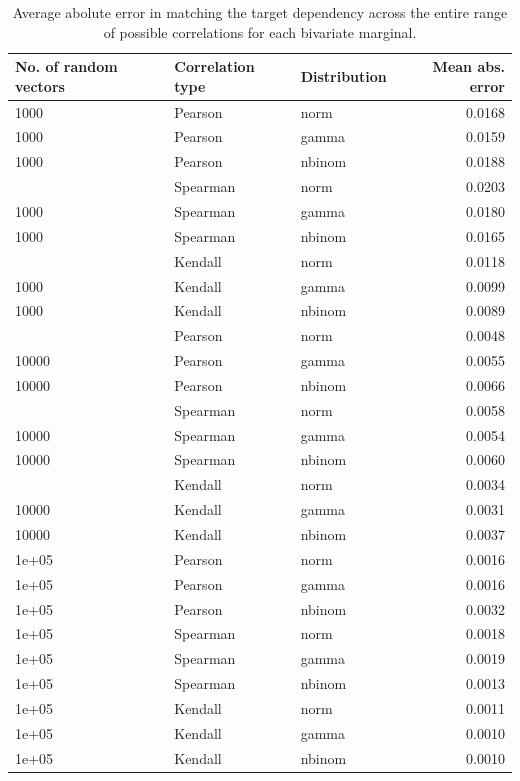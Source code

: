 \documentclass[
]{jss}
\begin{document}
\begin{CodeChunk}
\begin{table}
\caption{\label{tab:ch040-BiError}Average abolute error in matching the target dependency across the entire range of possible correlations for each bivariate marginal.}
\centering
\begin{tabular}[t]{lllr}
\toprule
No. of random vectors & Correlation type & Distribution & Mean abs. error\\
\midrule
1000 & Pearson & norm & 0.0168\\
1000 & Pearson & gamma & 0.0159\\
1000 & Pearson & nbinom & 0.0188\\
\addlinespace
1000 & Spearman & norm & 0.0203\\
1000 & Spearman & gamma & 0.0180\\
1000 & Spearman & nbinom & 0.0165\\
\addlinespace
1000 & Kendall & norm & 0.0118\\
1000 & Kendall & gamma & 0.0099\\
1000 & Kendall & nbinom & 0.0089\\
\addlinespace
10000 & Pearson & norm & 0.0048\\
10000 & Pearson & gamma & 0.0055\\
10000 & Pearson & nbinom & 0.0066\\
\addlinespace
10000 & Spearman & norm & 0.0058\\
10000 & Spearman & gamma & 0.0054\\
10000 & Spearman & nbinom & 0.0060\\
\addlinespace
10000 & Kendall & norm & 0.0034\\
10000 & Kendall & gamma & 0.0031\\
10000 & Kendall & nbinom & 0.0037\\
\addlinespace
1e+05 & Pearson & norm & 0.0016\\
1e+05 & Pearson & gamma & 0.0016\\
1e+05 & Pearson & nbinom & 0.0032\\
\addlinespace
1e+05 & Spearman & norm & 0.0018\\
1e+05 & Spearman & gamma & 0.0019\\
1e+05 & Spearman & nbinom & 0.0013\\
\addlinespace
1e+05 & Kendall & norm & 0.0011\\
1e+05 & Kendall & gamma & 0.0010\\
1e+05 & Kendall & nbinom & 0.0010\\
\bottomrule
\end{tabular}
\end{table}

\end{CodeChunk}
\end{document}
